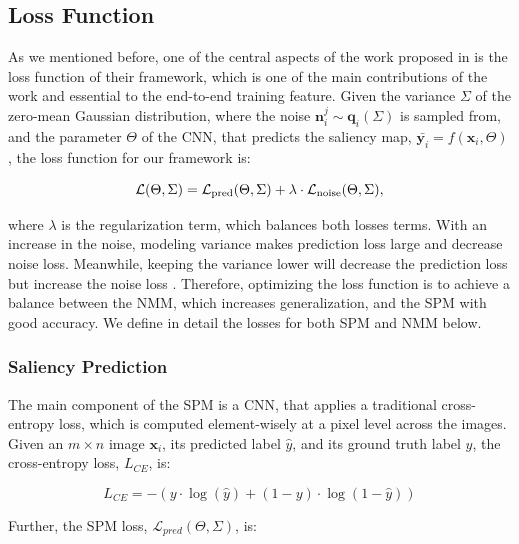 \documentclass{article}
\begin{document}
\subsection{Loss Function}
As we mentioned before, one of the central aspects of the work proposed in \cite{zhang2018} is the loss function of their framework, which is one of the main contributions of the work and essential to the end-to-end training feature. Given the variance $\Sigma$ of the zero-mean Gaussian distribution, where the noise $\boldsymbol{n}^{j}_i \sim\boldsymbol{q}_i(\Sigma)$ is sampled from, and the parameter $\Theta$ of the CNN, that predicts the saliency map, $\bar{\boldsymbol{y}_i} = f(\boldsymbol{x}_i, \Theta)$, the loss function for our framework is:

\begin{equation}
  \mathcal{L}(\Theta, \Sigma) = \mathcal{L}_{\textnormal{pred}}(\Theta, \Sigma) + \lambda \cdot \mathcal{L}_{\textnormal{noise}}(\Theta, \Sigma),
  \label{eq:loss_fn}
\end{equation}

where $\lambda$ is the regularization term, which balances both losses terms. With an increase in the noise, modeling variance makes prediction loss large and decrease noise loss. Meanwhile, keeping the variance lower will decrease the prediction loss but increase the noise loss \cite{zhang2018}. Therefore, optimizing the loss function is to achieve a balance between the NMM, which increases generalization, and the SPM with good accuracy. We define in detail the losses for both SPM and NMM below. 

\subsubsection{Saliency Prediction}

The main component of the SPM is a CNN, that applies a traditional cross-entropy loss, which is computed element-wisely at a pixel level across the images. Given an $m \times n$ image $\boldsymbol{x}_i$, its predicted label $\hat{y}$, and its ground truth label $y$, the cross-entropy loss, $L_{CE}$, is: 

\begin{equation}
  L_{CE} = - \left( y \cdot \log{(\hat{y})} + (1 - y) \cdot \log{(1 - \hat{y})} \right)
  \label{eq:cross-entropy}
\end{equation}

Further, the SPM loss, $\mathcal{L}_{pred}(\Theta,\Sigma)$, is: 
\end{document}
